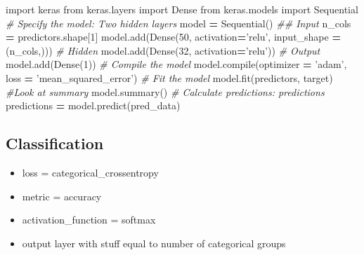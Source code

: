\documentclass[]{book}
\newenvironment{Shaded}{\begin{snugshade}}{\end{snugshade}}
\newcommand{\DecValTok}[1]{\textcolor[rgb]{0.00,0.00,0.81}{#1}}
\newcommand{\StringTok}[1]{\textcolor[rgb]{0.31,0.60,0.02}{#1}}
\newcommand{\ImportTok}[1]{#1}
\newcommand{\CommentTok}[1]{\textcolor[rgb]{0.56,0.35,0.01}{\textit{#1}}}
\newcommand{\OperatorTok}[1]{\textcolor[rgb]{0.81,0.36,0.00}{\textbf{#1}}}
\newcommand{\BuiltInTok}[1]{#1}
\newcommand{\NormalTok}[1]{#1}
\theoremstyle{definition}
\theoremstyle{definition}
\theoremstyle{definition}
\theoremstyle{remark}
\begin{document}
\begin{Shaded}
\begin{Highlighting}[]
\ImportTok{import}\NormalTok{ keras}
\ImportTok{from}\NormalTok{ keras.layers }\ImportTok{import}\NormalTok{ Dense}
\ImportTok{from}\NormalTok{ keras.models }\ImportTok{import}\NormalTok{ Sequential}
\CommentTok{# Specify the model: Two hidden layers}
\NormalTok{model }\OperatorTok{=}\NormalTok{ Sequential()}
\CommentTok{## Input}
\NormalTok{n_cols }\OperatorTok{=}\NormalTok{ predictors.shape[}\DecValTok{1}\NormalTok{]}
\NormalTok{model.add(Dense(}\DecValTok{50}\NormalTok{, activation}\OperatorTok{=}\StringTok{'relu'}\NormalTok{, input_shape }\OperatorTok{=}\NormalTok{ (n_cols,)))}
\CommentTok{# Hidden}
\NormalTok{model.add(Dense(}\DecValTok{32}\NormalTok{, activation}\OperatorTok{=}\StringTok{'relu'}\NormalTok{))}
\CommentTok{# Output}
\NormalTok{model.add(Dense(}\DecValTok{1}\NormalTok{))}
\CommentTok{# Compile the model}
\NormalTok{model.}\BuiltInTok{compile}\NormalTok{(optimizer }\OperatorTok{=} \StringTok{'adam'}\NormalTok{, loss }\OperatorTok{=} \StringTok{'mean_squared_error'}\NormalTok{) }
\CommentTok{# Fit the model}
\NormalTok{model.fit(predictors, target)}
\CommentTok{#Look at summary}
\NormalTok{model.summary()}
\CommentTok{# Calculate predictions: predictions}
\NormalTok{predictions }\OperatorTok{=}\NormalTok{ model.predict(pred_data)}
\end{Highlighting}
\end{Shaded}

\subsection{Classification}\label{classification}

\begin{itemize}
\item
  loss = categorical\_crossentropy
\item
  metric = accuracy
\item
  activation\_function = softmax
\item
  output layer with stuff equal to number of categorical groups
\end{itemize}
\end{document}
